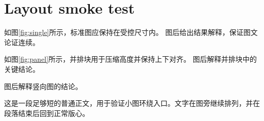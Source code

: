 \documentclass{ctexart}
\begin{document}
\section{Layout smoke test}
如图\ref{fig:single}所示，标准图应保持在受控尺寸内。
图后给出结果解释，保证图文论证连续。

如图\ref{fig:panel}所示，并排块用于压缩高度并保持上下对齐。
图后解释并排块中的关键结论。

图后解释竖向图的结论。

这是一段足够短的普通正文，用于验证小图环绕入口。文字在图旁继续排列，并在段落结束后回到正常版心。
\end{document}
